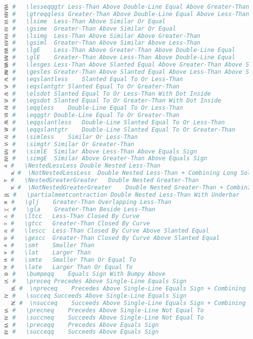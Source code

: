 \begin{lstlisting}[language=Julia, linewidth=\textwidth]
⪋ #   \lesseqqgtr Less-Than Above Double-Line Equal Above Greater-Than
⪌ #   \gtreqqless Greater-Than Above Double-Line Equal Above Less-Than
⪍ #   \lsime  Less-Than Above Similar Or Equal
⪎ #   \gsime  Greater-Than Above Similar Or Equal
⪏ #   \lsimg  Less-Than Above Similar Above Greater-Than
⪐ #   \gsiml  Greater-Than Above Similar Above Less-Than
⪑ #   \lgE    Less-Than Above Greater-Than Above Double-Line Equal
⪒ #   \glE    Greater-Than Above Less-Than Above Double-Line Equal
⪓ #   \lesges Less-Than Above Slanted Equal Above Greater-Than Above Slanted Equal
⪔ #   \gesles Greater-Than Above Slanted Equal Above Less-Than Above Slanted Equal
⪕ #   \eqslantless    Slanted Equal To Or Less-Than
⪖ #   \eqslantgtr Slanted Equal To Or Greater-Than
⪗ #   \elsdot Slanted Equal To Or Less-Than With Dot Inside
⪘ #   \egsdot Slanted Equal To Or Greater-Than With Dot Inside
⪙ #   \eqqless    Double-Line Equal To Or Less-Than
⪚ #   \eqqgtr Double-Line Equal To Or Greater-Than
⪛ #   \eqqslantless   Double-Line Slanted Equal To Or Less-Than
⪜ #   \eqqslantgtr    Double-Line Slanted Equal To Or Greater-Than
⪝ #   \simless    Similar Or Less-Than
⪞ #   \simgtr Similar Or Greater-Than
⪟ #   \simlE  Similar Above Less-Than Above Equals Sign
⪠ #   \simgE  Similar Above Greater-Than Above Equals Sign
⪡ #   \NestedLessLess Double Nested Less-Than
  ⪡̸ #  \NotNestedLessLess  Double Nested Less-Than + Combining Long Solidus Overlay
⪢ #   \NestedGreaterGreater   Double Nested Greater-Than
  ⪢̸ #  \NotNestedGreaterGreater    Double Nested Greater-Than + Combining Long Solidus
⪣ #   \partialmeetcontraction Double Nested Less-Than With Underbar
⪤ #   \glj    Greater-Than Overlapping Less-Than
⪥ #   \gla    Greater-Than Beside Less-Than
⪦ #   \ltcc   Less-Than Closed By Curve
⪧ #   \gtcc   Greater-Than Closed By Curve
⪨ #   \lescc  Less-Than Closed By Curve Above Slanted Equal
⪩ #   \gescc  Greater-Than Closed By Curve Above Slanted Equal
⪪ #   \smt    Smaller Than
⪫ #   \lat    Larger Than
⪬ #   \smte   Smaller Than Or Equal To
⪭ #   \late   Larger Than Or Equal To
⪮ #   \bumpeqq    Equals Sign With Bumpy Above
⪯ #   \preceq Precedes Above Single-Line Equals Sign
  ⪯̸ #  \npreceq    Precedes Above Single-Line Equals Sign + Combining Long Solidus Overlay
⪰ #   \succeq Succeeds Above Single-Line Equals Sign
  ⪰̸ #  \nsucceq    Succeeds Above Single-Line Equals Sign + Combining Long Solidus Overlay
⪱ #   \precneq    Precedes Above Single-Line Not Equal To
⪲ #   \succneq    Succeeds Above Single-Line Not Equal To
⪳ #   \preceqq    Precedes Above Equals Sign
⪴ #   \succeqq    Succeeds Above Equals Sign

\end{lstlisting}
